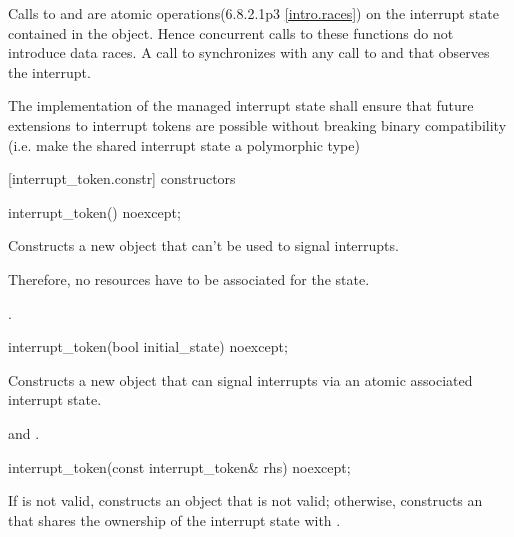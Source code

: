 {Calls to  and 
are atomic operations(6.8.2.1p3 \ref{intro.races})
on the interrupt state contained in the  object.
Hence concurrent calls to these functions do not introduce data races. 
A call to  synchronizes with any call to  and
 that observes the interrupt.

\begin{note} The implementation of the managed interrupt state
        shall ensure that future extensions to interrupt tokens
        are possible without breaking binary compatibility 
        (i.e. make the shared interrupt state a polymorphic type) \end{note}

[interrupt_token.constr]{ constructors}

%
\begin{itemdecl}
interrupt_token() noexcept;
\end{itemdecl}
\begin{itemdescr}
  \pnum\effects Constructs a new  object that can't be used to signal interrupts.
                \begin{note} Therefore, no resources have to be associated for the state.  \end{note}

  \pnum\postconditions {}.
\end{itemdescr}

%
\begin{itemdecl}
interrupt_token(bool initial_state) noexcept;
\end{itemdecl}
\begin{itemdescr}
  \pnum\effects Constructs a new  object that can signal interrupts
                via an atomic associated interrupt state.

  \pnum\postconditions {} and .
\end{itemdescr}

%
\begin{itemdecl}
interrupt_token(const interrupt_token& rhs) noexcept;
\end{itemdecl}
\begin{itemdescr}
  \pnum\effects If  is not valid, constructs an  object
                that is not valid;
                otherwise, constructs an 
                that shares the ownership of the interrupt state with .


\end{itemdescr}}
